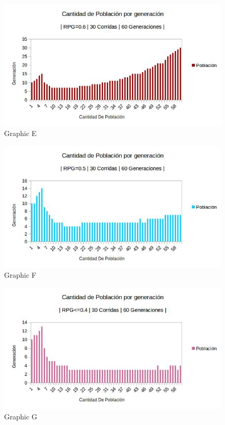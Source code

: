 \documentclass[twocolumn]{IEEEtran}
\begin{document}
\begin{enumerate}
    \begin{figure}[h!]
    \centering
    \includegraphics[width=\columnwidth]{src/rpg0_6.jpg}
	\caption{Graphic E}
    \label{fig:TESTRPG0.6}
    \end{figure}
    
    \begin{figure}[h!]
    \centering
    \includegraphics[width=\columnwidth]{src/rpg0_5.jpg}
	\caption{Graphic F}
    \label{fig:TESTRPG0.5}
    \end{figure}
    
    \begin{figure}[h!]
    \centering
    \includegraphics[width=\columnwidth]{src/rpg0_4.jpg}
	\caption{Graphic G}
    \label{fig:TESTRPG0.4}
    \end{figure}
    

\end{enumerate}
\end{document}

